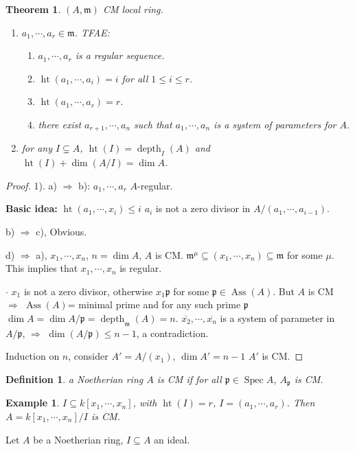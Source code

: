 \documentclass[cs4size]{article}
\newcommand{\su}{\subseteq}
\newcommand{\frm}{\mathfrak{m}}
\newcommand{\frp}{\mathfrak{p}}
\newcommand{\Ra}{\Rightarrow}
\DeclareMathOperator{\Spec}{Spec}
\DeclareMathOperator{\Ass}{Ass}
\DeclareMathOperator{\height}{ht}
\DeclareMathOperator{\depth}{depth}
\newtheorem{thm}{Theorem}
\newtheorem{definition}{Definition}
\newtheorem{ex}{Example}
\begin{document}
\begin{thm}
$(A,\frm)$ CM local ring.
\begin{enumerate}
\item $a_1,\cdots,a_r\in\frm$. TFAE:
\begin{enumerate}
\item $a_1,\cdots,a_r$ is a regular sequence.
\item $\height(a_1,\cdots,a_i)=i$ for all $1\leq i\leq r$.
\item $\height(a_1,\cdots,a_r)=r$.
\item there exist $a_{r+1},\cdots, a_n$ such that $a_1,\cdots,a_n$ is a system of parameters for $A$.
\end{enumerate}
\item for any $I\varsubsetneq A$, $\height(I)=\depth_I(A)$ and $\height(I)+\dim (A/I)=\dim A$.
\end{enumerate}
\end{thm}
\begin{proof}
1). a) $\Ra$ b): $a_1,\cdots,a_r$ $A$-regular.

\textbf{Basic idea:} $\height(a_1,\cdots,x_i)\leq i$ $a_i$ is not a zero divisor in $A/(a_1,\cdots,a_{i-1})$.

b) $\Ra$ c), Obvious.

d) $\Ra$ a), $x_1,\cdots,x_n$, $n=\dim A$, $A$ is CM. $\frm^\mu\su (x_1,\cdots,x_n)\su\frm$ for some $\mu$. This implies that $x_1,\cdots,x_n$ is regular.

$\cdot$ $x_1$ is not a zero divisor, otherwise $x_1\frp$ for some $\frp\in\Ass(A)$. But $A$ is CM $\Ra$ $\Ass(A)$= minimal prime and for any such prime $\frp$ $\dim A=\dim A/\frp=\depth_\frm(A)=n$. $\overline{x_2},\cdots,\overline{x_n}$ is a system of parameter in $A/\frp$, $\Ra$ $\dim (A/\frp)\leq n-1$, a contradiction.

Induction on $n$, consider $A'=A/(x_1)$, $\dim A'=n-1$ $A'$ is CM.
\end{proof}

\begin{definition}
a Noetherian ring $A$ is CM if for all $\frp\in\Spec A$, $A_\frp$ is CM.
\end{definition}

\begin{ex}
$I\su k[x_1,\cdots,x_n]$, with $\height(I)=r$, $I=(a_1,\cdots,a_r)$. Then $A=k[x_1,\cdots,x_n]/I$ is CM.
\end{ex}

Let $A$ be a Noetherian ring, $I\su A$ an ideal.
\end{document}
